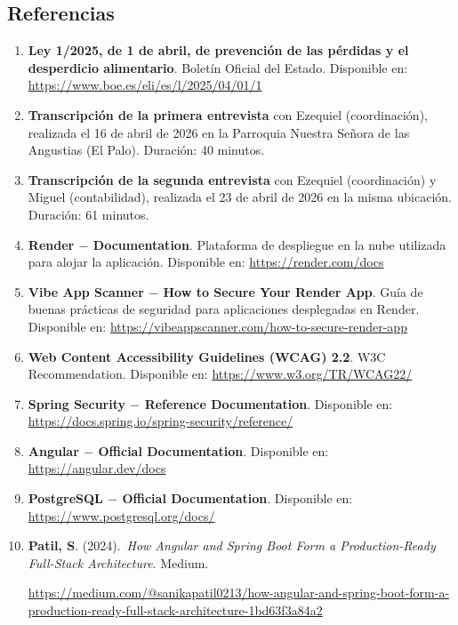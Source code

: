 \subsection{Referencias}
\begin{enumerate}
    \item \textbf{Ley 1/2025, de 1 de abril, de prevención de las pérdidas y el desperdicio
   alimentario}. Boletín Oficial del Estado. Disponible en: \url{https://www.boe.es/eli/es/l/2025/04/01/1}

    \item \textbf{Transcripción de la primera entrevista} con Ezequiel (coordinación),
   realizada el 16 de abril de 2026 en la Parroquia Nuestra Señora de las
   Angustias (El Palo). Duración: 40 minutos.

    \item \textbf{Transcripción de la segunda entrevista} con Ezequiel (coordinación) y
   Miguel (contabilidad), realizada el 23 de abril de 2026 en la misma
   ubicación. Duración: 61 minutos.

    \item \textbf{Render $-$ Documentation}. Plataforma de despliegue en la nube utilizada
   para alojar la aplicación. Disponible en: \url{https://render.com/docs}

    \item \textbf{Vibe App Scanner $-$ How to Secure Your Render App}. Guía de buenas
   prácticas de seguridad para aplicaciones desplegadas en Render. Disponible en: \url{https://vibeappscanner.com/how-to-secure-render-app}

    \item \textbf{Web Content Accessibility Guidelines (WCAG) 2.2}. W3C Recommendation. Disponible en: \url{https://www.w3.org/TR/WCAG22/}
    
    \item \textbf{Spring Security $-$ Reference Documentation}. Disponible en: \url{https://docs.spring.io/spring-security/reference/}
    
    \item \textbf{Angular $-$ Official Documentation}. Disponible en: \url{https://angular.dev/docs}
    
    \item \textbf{PostgreSQL $-$ Official Documentation}. Disponible en: \url{https://www.postgresql.org/docs/}
    
    \item \textbf{Patil, S}. (2024).\ \textit{How Angular and Spring Boot Form a
    Production-Ready Full-Stack Architecture}. Medium.
    \par
    \noindent 
    \url{https://medium.com/@sanikapatil0213/how-angular-and-spring-boot-form-a-production-ready-full-stack-architecture-1bd63f3a84a2}
\end{enumerate}

